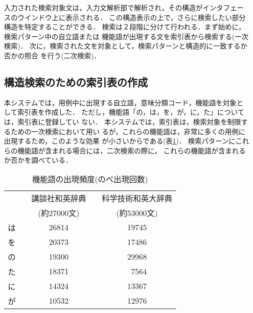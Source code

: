 入力された検索対象文は，入力文解析部で解析され，その構造がインタフェー
スのウインドウ上に表示される．
この構造表示の上で，さらに検索したい部分構造を特定することができる．
検索は２段階に分けて行われる．まず始めに，検索パターン中の自立語または
機能語が出現する文を索引表から検索する(一次検索)．
次に，検索された文を対象として，検索パターンと構造的に一致するか否かの照合
を行う(二次検索)．


\subsection{構造検索のための索引表の作成}
本システムでは，用例中に出現する自立語，意味分類コード，機能語を対象と
して索引表を作成した．
ただし，機能語「の，は，を，が，に，た」については，索引表に登録してい
ない．
本システムでは，索引表は，検索対象を制限するための一次検索において用い
るが，これらの機能語は，非常に多くの用例に出現するため，このような効果
が小さいからである(表\ref{func})．
検索パターンにこれらの機能語が含まれる場合には，二次検索の際に，
これらの機能語が含まれるか否かを調べている．

\begin{table}[htb]
\begin{center}
\vspace{-5mm}
\caption{機能語の出現頻度(のべ出現回数)}
\label{func}
\begin{tabular}{|c||c|c|} \hline
& {\small \ \ 講談社和英辞典\ \ } & {\small 科学技術和英大辞典} \\ 
& {\small (約27000文)} & {\small (約53000文)} \\ \hline \hline
は  &  26814        & 19745     \\ \hline
を  &  20373        & 17486     \\ \hline
の  &  19300        & 29968     \\ \hline
た  &  18371        & \ 7564      \\ \hline
に  &  14324        & 13367     \\ \hline
が  &  10532        & 12976     \\ \hline
\end{tabular}\\
\vspace{-9mm}
\end{center}
\end{table}

